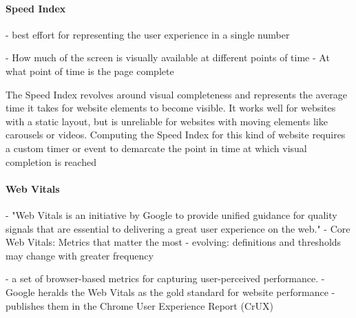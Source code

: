 \paragraph{Speed Index}







- best effort for representing the user experience in a single number







- How much of the screen is visually available at different points of time
- At what point of time is the page complete



The Speed Index revolves around visual completeness and represents the average time it takes for website elements to become visible. It works well for websites with a static layout, but is unreliable for websites with moving elements like carousels or videos. Computing the Speed Index for this kind of website requires a custom timer or event to demarcate the point in time at which visual completion is reached





\paragraph{Web Vitals}




- "Web Vitals is an initiative by Google to provide unified guidance for quality signals that are essential to delivering a great user experience on the web."
- Core Web Vitals: Metrics that matter the most
 - evolving: definitions and thresholds may change with greater frequency


- a set of browser-based metrics for capturing user-perceived performance.
- Google heralds the Web Vitals as the gold standard for website performance
- publishes them in the Chrome User Experience Report (CrUX)



